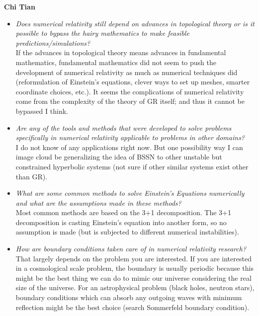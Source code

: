 \documentclass[11pt]{homework}
\begin{document}

\large{\bf Chi Tian}
\small

\begin{itemize}

\item {\em Does numerical relativity still depend on advances in topological theory or is it possible to bypass the hairy mathematics to make feasible predictions/simulations?} \\
If the advances in topological theory means advances in fundamental mathematics, fundamental mathematics did not seem to push the development of numerical relativity as much as numerical techniques did (reformulation of Einstein's equations, clever ways to set up meshes, smarter coordinate choices, etc.). It seems the complications of numerical relativity come from the complexity of the theory of GR itself; and thus it cannot be bypassed I think.

\item {\em Are any of the tools and methods that were developed to solve problems specifically in numerical relativity applicable to problems in other domains?} \\
I do not know of any applications right now. But one possibility way I can image cloud be generalizing the idea of BSSN to other unstable but constrained hyperbolic systems (not sure if other similar systems exist other than GR).

\item {\em What are some common methods to solve Einstein's Equations numerically and what are the assumptions made in these methods?} \\
Most common methods are based on the 3+1 decomposition. The 3+1 decomposition is casting Einstein's equation into another form, so no assumption is made (but is subjected to different numerical instabilities).

\item {\em How are boundary conditions taken care of in numerical relativity research?} \\
That largely depends on the problem you are interested. If you are interested in a cosmological scale problem, the boundary is usually periodic because this might be the best thing we can do to mimic our universe considering the real size of the universe. For an astrophysical problem (black holes, neutron stars), boundary conditions which can absorb any outgoing waves with minimum reflection might be the best choice (search Sommerfeld boundary condition).


\end{itemize}
\end{document}
